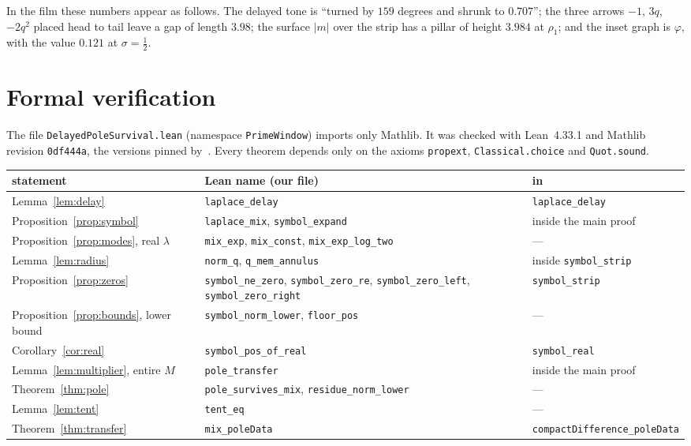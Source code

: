 \documentclass[11pt]{amsart}
\theoremstyle{definition}
\theoremstyle{remark}
\newcommand{\lean}[1]{\texttt{#1}}
\begin{document}
In the film these numbers appear as follows. The delayed tone is ``turned by $159$ degrees and
shrunk to $0.707$''; the three arrows $-1$, $3q$, $-2q^2$ placed head to tail leave a gap of length
$3.98$; the surface $|m|$ over the strip has a pillar of height $3.984$ at $\rho_1$; and the inset
graph is $\varphi$, with the value $0.121$ at $\sigma=\tfrac12$.

\section{Formal verification}\label{sec:lean}

The file \lean{DelayedPoleSurvival.lean} (namespace \lean{PrimeWindow}) imports only Mathlib. It was
checked with Lean~4.33.1 and Mathlib revision \lean{0df444a}, the versions pinned
by~\cite{Crossley-transfer}. Every theorem depends only on the axioms \lean{propext},
\lean{Classical.choice} and \lean{Quot.sound}.

\begin{center}
\footnotesize
\begin{tabular}{@{}p{}p{}p{}@{}}
\toprule
statement & Lean name (our file) & in \cite{Crossley-transfer}\\
\midrule
Lemma~\ref{lem:delay} & \lean{laplace\_delay} & \lean{laplace\_delay}\\
Proposition~\ref{prop:symbol} & \lean{laplace\_mix}, \lean{symbol\_expand} & inside the main proof\\
Proposition~\ref{prop:modes}, real $\lambda$ & \lean{mix\_exp}, \lean{mix\_const}, \lean{mix\_exp\_log\_two} & ---\\
Lemma~\ref{lem:radius} & \lean{norm\_q}, \lean{q\_mem\_annulus} & inside \lean{symbol\_strip}\\
Proposition~\ref{prop:zeros} & \lean{symbol\_ne\_zero}, \lean{symbol\_zero\_re}, \lean{symbol\_zero\_left}, \lean{symbol\_zero\_right} & \lean{symbol\_strip}\\
Proposition~\ref{prop:bounds}, lower bound & \lean{symbol\_norm\_lower}, \lean{floor\_pos} & ---\\
Corollary~\ref{cor:real} & \lean{symbol\_pos\_of\_real} & \lean{symbol\_real}\\
Lemma~\ref{lem:multiplier}, entire $M$ & \lean{pole\_transfer} & inside the main proof\\
Theorem~\ref{thm:pole} & \lean{pole\_survives\_mix}, \lean{residue\_norm\_lower} & ---\\
Lemma~\ref{lem:tent} & \lean{tent\_eq} & ---\\
Theorem~\ref{thm:transfer} & \lean{mix\_poleData} & \lean{compactDifference\_poleData}\\
\bottomrule
\end{tabular}
\end{center}
\end{document}
